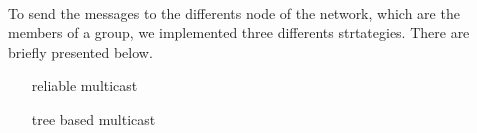 


\paragraph{}{
    To send the messages to the differents node of the network,
 which are the members of a group, we implemented three differents
 strtategies. There are briefly presented below.
}

\begin{itemize}
     This strategy only send messages
        to the member of the view...
    \item[reliable multicast]
    \item[tree based multicast]


\end{itemize}

